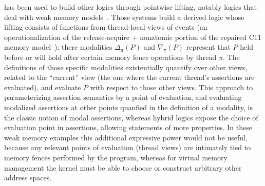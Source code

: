 \iris has been used to build other logics through pointwise lifting, notably logics that deal with weak
memory models~\cite{dang2019rustbelt,dang2022compass}. Those systems build a derived logic
whose lifting consists of functions from thread-local views of events (an operationalization of the release-acquire + nonatomic
portion of the repaired C11 memory model~\cite{lahav2017repairing}): there modalities $\Delta_\pi(P)$ and $\nabla_\pi(P)$
represent that $P$ held before or will hold after certain memory fence operations by thread $\pi$.
The definitions of those specific modalities existentially quantify over other views, related to the ``current'' view (the one where
the current thread's assertions are evaluated), and evaluate $P$ with respect to those other views. This approach to parameterizing
assertion semantics by a point of evaluation, and evaluating modalized assertions at other points quanfied in the definition of a modality,
is the classic notion of modal assertions, whereas hybrid logics expose the choice of evaluation point in assertions,
allowing statements of more properties. In these weak memory examples this additional expressive power would not be useful,
because any relevant points of evaluation (thread views) are intimately tied to memory fences performed by the program, whereas
for virtual memory management the kernel must be able to choose or construct arbitrary other address spaces.



